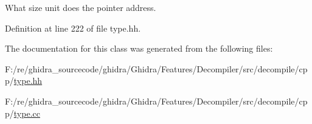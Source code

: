 What size unit does the pointer address. 



Definition at line 222 of file type.\+hh.



The documentation for this class was generated from the following files\+:\begin{DoxyCompactItemize}
\item 
F\+:/re/ghidra\+\_\+sourcecode/ghidra/\+Ghidra/\+Features/\+Decompiler/src/decompile/cpp/\mbox{\hyperlink{type_8hh}{type.\+hh}}\item 
F\+:/re/ghidra\+\_\+sourcecode/ghidra/\+Ghidra/\+Features/\+Decompiler/src/decompile/cpp/\mbox{\hyperlink{type_8cc}{type.\+cc}}\end{DoxyCompactItemize}
